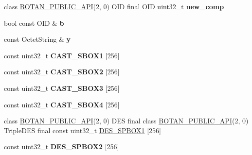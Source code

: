 \begin{DoxyCompactItemize}
\item 
\mbox{\label{namespace_botan_a208fee569d7b08fa981f19dfea0cec43}} 
class \mbox{\hyperlink{namespace_botan_a6b9388030d872e586a4655b776ac9501}{B\+O\+T\+A\+N\+\_\+\+P\+U\+B\+L\+I\+C\+\_\+\+A\+PI}}(2, 0) O\+ID final O\+ID uint32\+\_\+t {\bfseries new\+\_\+comp}
\item 
\mbox{\label{namespace_botan_a377230281adf76b940163a9b9336a5df}} 
bool const O\+ID \& {\bfseries b}
\item 
\mbox{\label{namespace_botan_afae07b13b8c62b093ca774a163c7fd69}} 
const Octet\+String \& {\bfseries y}
\item 
\mbox{\label{namespace_botan_a72bc7086bfb043dc03306af8c7860bba}} 
const uint32\+\_\+t {\bfseries C\+A\+S\+T\+\_\+\+S\+B\+O\+X1} \mbox{[}256\mbox{]}
\item 
\mbox{\label{namespace_botan_abb279ea8bbf721383d7947680eabfcfb}} 
const uint32\+\_\+t {\bfseries C\+A\+S\+T\+\_\+\+S\+B\+O\+X2} \mbox{[}256\mbox{]}
\item 
\mbox{\label{namespace_botan_aef142127d5d4ade45ca1aea3a850db58}} 
const uint32\+\_\+t {\bfseries C\+A\+S\+T\+\_\+\+S\+B\+O\+X3} \mbox{[}256\mbox{]}
\item 
\mbox{\label{namespace_botan_a97ba2699c0070b79b152f2074af6b515}} 
const uint32\+\_\+t {\bfseries C\+A\+S\+T\+\_\+\+S\+B\+O\+X4} \mbox{[}256\mbox{]}
\item 
class \mbox{\hyperlink{namespace_botan_a6b9388030d872e586a4655b776ac9501}{B\+O\+T\+A\+N\+\_\+\+P\+U\+B\+L\+I\+C\+\_\+\+A\+PI}}(2, 0) D\+ES final class \mbox{\hyperlink{namespace_botan_a6b9388030d872e586a4655b776ac9501}{B\+O\+T\+A\+N\+\_\+\+P\+U\+B\+L\+I\+C\+\_\+\+A\+PI}}(2, 0) Triple\+D\+ES final const uint32\+\_\+t \mbox{\hyperlink{namespace_botan_ad1f2122e900d9b65e6c949734915b67b}{D\+E\+S\+\_\+\+S\+P\+B\+O\+X1}} \mbox{[}256\mbox{]}
\item 
\mbox{\label{namespace_botan_abbbad125410a71678b33cb844ab4dc5a}} 
const uint32\+\_\+t {\bfseries D\+E\+S\+\_\+\+S\+P\+B\+O\+X2} \mbox{[}256\mbox{]}
\item 

\end{DoxyCompactItemize}
